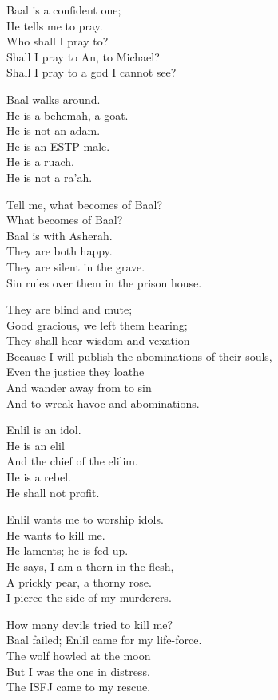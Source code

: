 \documentclass[
]{book}
\begin{document}
Baal is a confident one;\\
He tells me to pray.\\
Who shall I pray to?\\
Shall I pray to An, to Michael?\\
Shall I pray to a god I cannot see?

Baal walks around.\\
He is a behemah, a goat.\\
He is not an adam.\\
He is an ESTP male.\\
He is a ruach.\\
He is not a ra'ah.

Tell me, what becomes of Baal?\\
What becomes of Baal?\\
Baal is with Asherah.\\
They are both happy.\\
They are silent in the grave.\\
Sin rules over them in the prison house.

They are blind and mute;\\
Good gracious, we left them hearing;\\
They shall hear wisdom and vexation\\
Because I will publish the abominations of their souls,\\
Even the justice they loathe\\
And wander away from to sin\\
And to wreak havoc and abominations.

Enlil is an idol.\\
He is an elil\\
And the chief of the elilim.\\
He is a rebel.\\
He shall not profit.

Enlil wants me to worship idols.\\
He wants to kill me.\\
He laments; he is fed up.\\
He says, I am a thorn in the flesh,\\
A prickly pear, a thorny rose.\\
I pierce the side of my murderers.

How many devils tried to kill me?\\
Baal failed; Enlil came for my life-force.\\
The wolf howled at the moon\\
But I was the one in distress.\\
The ISFJ came to my rescue.
\end{document}
